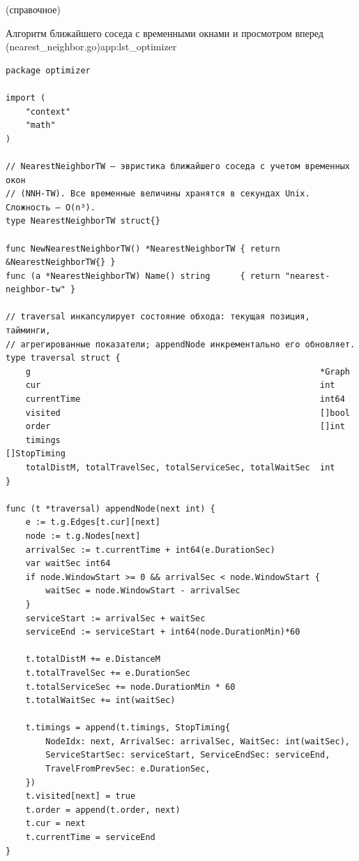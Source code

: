 \setcounter{chapter}{5}

\begin{center}(справочное)\end{center}

\setcounter{listing}{0}
\renewcommand{\thelisting}{Б.\arabic{listing}}

\begin{codelisting}{Алгоритм ближайшего соседа с временными окнами и просмотром вперед (nearest\_neighbor.go)}{app:lst_optimizer}
    \begin{verbatim}
package optimizer

import (
    "context"
    "math"
)

// NearestNeighborTW — эвристика ближайшего соседа с учетом временных окон
// (NNH-TW). Все временные величины хранятся в секундах Unix. Сложность — O(n³).
type NearestNeighborTW struct{}

func NewNearestNeighborTW() *NearestNeighborTW { return &NearestNeighborTW{} }
func (a *NearestNeighborTW) Name() string      { return "nearest-neighbor-tw" }

// traversal инкапсулирует состояние обхода: текущая позиция, тайминги,
// агрегированные показатели; appendNode инкрементально его обновляет.
type traversal struct {
    g                                                          *Graph
    cur                                                        int
    currentTime                                                int64
    visited                                                    []bool
    order                                                      []int
    timings                                                    []StopTiming
    totalDistM, totalTravelSec, totalServiceSec, totalWaitSec  int
}

func (t *traversal) appendNode(next int) {
    e := t.g.Edges[t.cur][next]
    node := t.g.Nodes[next]
    arrivalSec := t.currentTime + int64(e.DurationSec)
    var waitSec int64
    if node.WindowStart >= 0 && arrivalSec < node.WindowStart {
        waitSec = node.WindowStart - arrivalSec
    }
    serviceStart := arrivalSec + waitSec
    serviceEnd := serviceStart + int64(node.DurationMin)*60

    t.totalDistM += e.DistanceM
    t.totalTravelSec += e.DurationSec
    t.totalServiceSec += node.DurationMin * 60
    t.totalWaitSec += int(waitSec)

    t.timings = append(t.timings, StopTiming{
        NodeIdx: next, ArrivalSec: arrivalSec, WaitSec: int(waitSec),
        ServiceStartSec: serviceStart, ServiceEndSec: serviceEnd,
        TravelFromPrevSec: e.DurationSec,
    })
    t.visited[next] = true
    t.order = append(t.order, next)
    t.cur = next
    t.currentTime = serviceEnd
}


\end{verbatim}
\end{codelisting}
